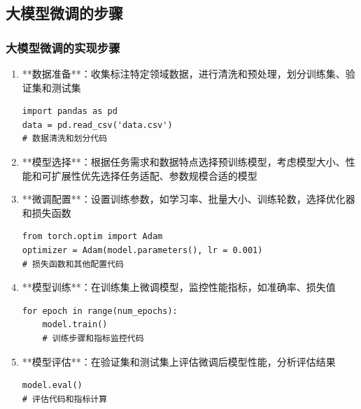 \subsection{大模型微调的步骤}
\begin{frame}
    \frametitle{大模型微调的实现步骤}
    \begin{enumerate}
        \item **数据准备**：收集标注特定领域数据，进行清洗和预处理，划分训练集、验证集和测试集
            \begin{lstlisting}[style=pythonstyle]
import pandas as pd
data = pd.read_csv('data.csv')
# 数据清洗和划分代码
            \end{lstlisting}
        \item **模型选择**：根据任务需求和数据特点选择预训练模型，考虑模型大小、性能和可扩展性优先选择任务适配、参数规模合适的模型
        \item **微调配置**：设置训练参数，如学习率、批量大小、训练轮数，选择优化器和损失函数
            \begin{lstlisting}[style=pythonstyle]
from torch.optim import Adam
optimizer = Adam(model.parameters(), lr = 0.001)
# 损失函数和其他配置代码
            \end{lstlisting}
        \item **模型训练**：在训练集上微调模型，监控性能指标，如准确率、损失值
            \begin{lstlisting}[style=pythonstyle]
for epoch in range(num_epochs):
    model.train()
    # 训练步骤和指标监控代码
            \end{lstlisting}
            \begin{center}
            \end{center}
        \item **模型评估**：在验证集和测试集上评估微调后模型性能，分析评估结果
            \begin{lstlisting}[style=pythonstyle]
model.eval()
# 评估代码和指标计算
            \end{lstlisting}
    \end{enumerate}
    \begin{center}
    \end{center}
\end{frame}

